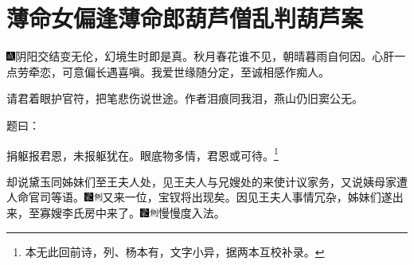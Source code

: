 
\chapter{薄命女偏逢薄命郎\hspace{.5em}葫芦僧乱判葫芦案}

{\includegraphics[width=3mm]{../Images/00005}\kaishu 阴阳交结变无伦，幻境生时即是真。秋月春花谁不见，朝晴暮雨自何因。心肝一点劳牵恋，可意偏长遇喜嗔。我爱世缘随分定，至诚相感作痴人。}

{\kaishu 请君着眼护官符，把笔悲伤说世途。作者泪痕同我泪，燕山仍旧窦公无。}

题曰：

捐躯报君恩，未报躯犹在。眼底物多情，君恩或可待。\footnote{本无此回前诗，列、杨本有，文字小异，据两本互校补录。}

却说黛玉同姊妹们至王夫人处，见王夫人与兄嫂处的来使计议家务，又说姨母家遭人命官司等语。{\includegraphics[width=3mm]{../Images/00006}\includegraphics[width=3mm]{../Images/00011}\footnotesize \kaishu 又来一位，宝钗将出现矣。}因见王夫人事情冗杂，姊妹们遂出来，至寡嫂李氏房中来了。{\includegraphics[width=3mm]{../Images/00006}\includegraphics[width=3mm]{../Images/00011}\footnotesize \kaishu 慢慢度入法。}

